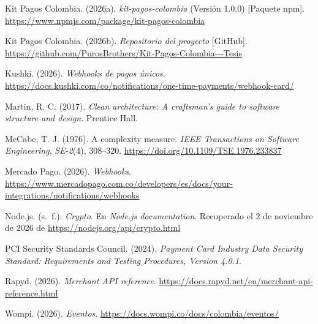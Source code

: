 \noindent Kit Pagos Colombia. (2026a). \textit{kit-pagos-colombia} (Versión 1.0.0) [Paquete npm]. \url{https://www.npmjs.com/package/kit-pagos-colombia}

\noindent Kit Pagos Colombia. (2026b). \textit{Repositorio del proyecto} [GitHub]. \url{https://github.com/PurosBrothers/Kit-Pagos-Colombia---Tesis}

\noindent Kushki. (2026). \textit{Webhooks de pagos únicos}. \url{https://docs.kushki.com/co/notifications/one-time-payments/webhook-card/}

\noindent Martin, R. C. (2017). \textit{Clean architecture: A craftsman's guide to software structure and design}. Prentice Hall.

\noindent McCabe, T. J. (1976). A complexity measure. \textit{IEEE Transactions on Software Engineering}, \textit{SE-2}(4), 308--320. \url{https://doi.org/10.1109/TSE.1976.233837}

\noindent Mercado Pago. (2026). \textit{Webhooks}. \url{https://www.mercadopago.com.co/developers/es/docs/your-integrations/notifications/webhooks}

\noindent Node.js. (s.~f.). \textit{Crypto}. En \textit{Node.js documentation}. Recuperado el 2 de noviembre de 2026 de \url{https://nodejs.org/api/crypto.html}

\noindent PCI Security Standards Council. (2024). \textit{Payment Card Industry Data Security Standard: Requirements and Testing Procedures, Version 4.0.1}.

\noindent Rapyd. (2026). \textit{Merchant API reference}. \url{https://docs.rapyd.net/en/merchant-api-reference.html}

\noindent Wompi. (2026). \textit{Eventos}. \url{https://docs.wompi.co/docs/colombia/eventos/}

\endgroup